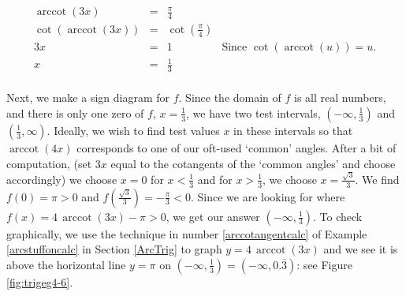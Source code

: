 {\begin{enumerate}
\[ \begin{array}{rclr}

\operatorname{arccot}(3x) & = & \frac{\pi}{4} & \\ [5pt]
\cot(\operatorname{arccot}(3x)) & = & \cot\left(\frac{\pi}{4}\right) & \\ [5pt]
3x & = & 1 & \text{Since $\cot(\operatorname{arccot}(u)) = u$.} \\ [5pt]
x & = & \frac{1}{3} &  \\ \end{array}\]


Next, we make a sign diagram for $f$.  Since the domain of $f$ is all real numbers, and there is only one zero of $f$, $x = \frac{1}{3}$, we have two test intervals, $\left(-\infty, \frac{1}{3}\right)$ and  $\left(\frac{1}{3}, \infty \right)$. Ideally, we wish to find test values $x$ in these intervals so that $\operatorname{arccot}(4x)$ corresponds to one of our oft-used `common' angles.  After a bit of computation, (set $3x$ equal to the cotangents of the `common angles' and choose accordingly) we choose $x=0$ for $x < \frac{1}{3}$ and for $x > \frac{1}{3}$, we choose $x = \frac{\sqrt{3}}{3}$.  We find $f(0) = \pi > 0$ and $f\left(\frac{\sqrt{3}}{3}\right) = -\frac{\pi}{3} < 0$.  Since we are looking for where $f(x) = 4 \, \operatorname{arccot}(3x) -  \pi > 0$, we get our answer $\left(-\infty, \frac{1}{3}\right)$.  To check graphically, we use the technique in number \ref{arccotangentcalc} of Example \ref{arcstuffoncalc} in Section \ref{ArcTrig} to graph $y = 4 \, \operatorname{arccot}(3x)$  and we see it is above the horizontal line $y = \pi$ on $\left(-\infty, \frac{1}{3}\right) = \left(-\infty, 0.\overline{3}\right)$: see Figure \ref{fig:trigeg4-6}.



\end{enumerate}
}
 


